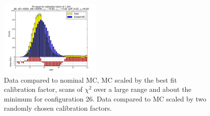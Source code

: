 \begin{figure}[htbp]
\begin{center}
\includegraphics[width=0.45\textwidth]{../FIGURES/26/FIG_Fit_result_for_calibration_factor_of_1_324.pdf} 
\caption{Data compared to nominal MC, MC scaled by the best fit calibration factor, scans of $\chi^2$ over a large range and about the minimum for configuration 26. Data compared to MC scaled by two randomly chosen calibration factors.} 
\label{tab:best_26} 
\end{center} \end{figure} 

